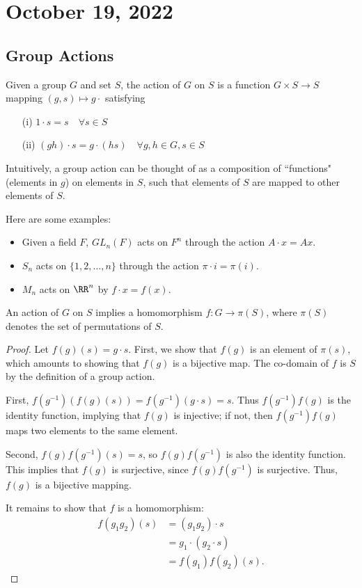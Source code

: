 \section{October 19, 2022}
\subsection{Group Actions}

\begin{definition}

Given a group $G$ and set $S$, the \ac{action} of $G$ on $S$ is a function $G\times S\rightarrow S$ mapping $(g,s)\mapsto g\cdot$ satisfying 
\begin{enumerate}
    \item [(i)] $1\cdot s = s\quad \forall s\in S$
    \item [(ii)] $(gh)\cdot s = g\cdot (hs) \quad \forall g,h\in G, s\in S$ 
\end{enumerate}
\end{definition}

Intuitively, a group action can be thought of as a composition of ``functions" (elements in $g$) on elements in $S$, such that elements of $S$ are mapped to other elements of $S$.

Here are some examples:
\begin{itemize}
    \item Given a field $F$, $GL_n(F)$ acts on $F^n$ through the action $A\cdot x = Ax$.
    \item $S_n$ acts on $\{1,2,\hdots, n\}$ through the action $\pi \cdot i = \pi(i)$.
    \item $M_n$ acts on $\RR^n$ by $f\cdot x = f(x)$.
\end{itemize}

\begin{theorem}
  \proplabel
  
  An action of $G$ on $S$ implies a homomorphism $f: G\rightarrow \pi(S)$, where $\pi(S)$ denotes the set of permutations of $S$.
\end{theorem}

\begin{proof}
  Let $f(g)(s) = g\cdot s$. First, we show that $f(g)$ is an element of $\pi(s)$, which amounts to showing that $f(g)$ is a bijective map. The co-domain of $f$ is $S$ by the definition of a group action. 
  
  First, $f(g^{-1})(f(g)(s)) = f(g^{-1})(g\cdot s) = s$. Thus $f(g^{-1})f(g)$ is the identity function, implying that $f(g)$ is injective; if not, then $f(g^{-1})f(g)$ maps two elements to the same element. 
  
  Second, $f(g)f(g^{-1})(s) = s$, so $f(g)f(g^{-1})$ is also the identity function. This implies that $f(g)$ is surjective, since $f(g)f(g^{-1})$ is surjective. Thus, $f(g)$ is a bijective mapping.
  
  It remains to show that $f$ is a homomorphism:
  \begin{align*}
      f(g_1g_2)(s) &= (g_1g_2)\cdot s \\
      &= g_1\cdot (g_2\cdot s) \\ 
      &= f(g_1)f(g_2)(s).
  \end{align*}
\end{proof}

